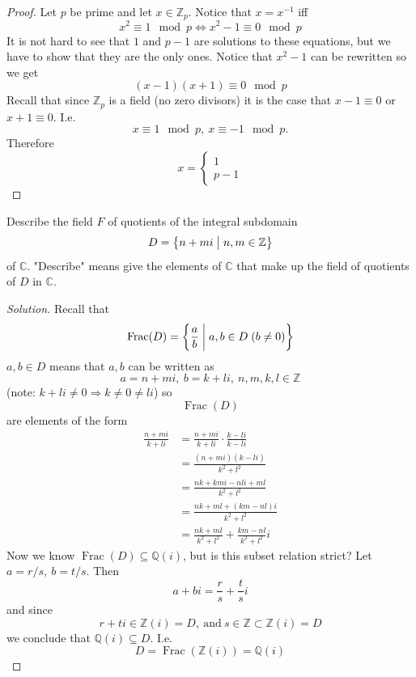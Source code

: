 \begin{proof}
    Let $p$ be prime and let $x \in \mathbb Z_p$. 
    Notice that $x = x^{-1}$ iff 
    \[
        x^2 \equiv 1 \mod p \Leftrightarrow x^2 - 1 \equiv 0 \mod p
    \]
    It is not hard to see that $1$ and $p-1$ are solutions to 
    these equations, but we have to show that they are the only ones.
    Notice that $x^2 - 1$ can be rewritten so we get 
    \[
        (x-1)(x+1) \equiv 0 \mod p
    \]
    Recall that since $\mathbb Z_p$ is a field (no zero divisors) 
    it is the case that 
    $x-1 \equiv 0$ or $x + 1 \equiv 0$. I.e. 
    \[
        x \equiv 1 \mod p, \ x \equiv - 1 \mod p.
    \]
    Therefore
    \[
        x = 
        \begin{cases}
            1 \\ p-1
        \end{cases}
    \]
\end{proof}
\begin{prob}
    Describe the field $F$ of quotients of the integral subdomain
    \[
        D = \left\{n+mi \bigm| n,m \in \mathbb Z\right\}
    \]
    of $\mathbb C$. "Describe" means give the elements of 
    $\mathbb C$ that make up the field of quotients of $D$ 
    in $\mathbb C$.
\end{prob}
\begin{proof}[Solution]
    Recall that 
    \[
        \operatorname{Frac}(D) = 
        \left\{ \frac{a}{b} \biggm| a,b \in D \; (b \neq 0) \right\}
    \]
    $a,b \in D$ means that $a,b$ can be written as 
    \[
        a = n+mi, \ b = k+li, \ n,m,k,l \in \mathbb Z
    \]
    (note: $k+li \neq 0 \Rightarrow k \neq 0 \neq li$)
    so 
    \[
        \operatorname{Frac}(D) 
    \]
    are elements of the form 
    \begin{align*}
        \frac{n+mi}{k+li} &= \frac{n+mi}{k+li}\cdot\frac{k-li}{k-li}\\
        &= \frac{(n+mi)(k-li)}{k^2 + l^2} \\ 
        &= \frac{nk+kmi-nli + ml}{k^2 + l^2} \\ 
        &= \frac{nk+ml + (km-nl)i}{k^2 + l^2} \\ 
        &= \frac{nk+ml}{k^2 + l^2} + \frac{km-nl}{k^2+l^2}i 
    \end{align*}
    Now we know $\operatorname{Frac}(D) \subseteq \mathbb Q(i)$, but 
    is this subset relation strict?
    Let $a = r/s, \ b = t/s$. 
    Then 
    \[
        a+bi = \frac{r}{s} + \frac{t}{s}i 
    \]
    and since 
    \[
        r+ti \in \mathbb Z(i) = D, \ \text{and} \ 
        s \in \mathbb Z \subset \mathbb Z(i) = D
    \]
    we conclude that $\mathbb Q(i) \subseteq D$. 
    I.e. 
    \[
        D = \operatorname{Frac}(\mathbb Z(i)) = \mathbb Q(i) 
    \]
\end{proof}

